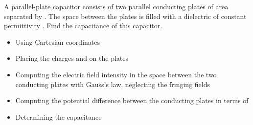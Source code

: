 \begin{ELexample}{}

A parallel-plate capacitor consists of two parallel conducting plates of area  separated by . The space between the plates is filled with a dielectric of constant permittivity \ELim{\epsilon}. Find the capacitance of this capacitor.


\begin{ELsolution}

\begin{itemize}
\tightlist
\item
  Using Cartesian coordinates
\item
  Placing the charges  and  on the plates \ELim{\ELto} 
\item
  Computing the electric field intensity in the space between the two conducting plates with Gauss's law, neglecting the fringing fields
\end{itemize}


\begin{itemize}
\tightlist
\item
  Computing the potential difference between the conducting plates in terms of 
\end{itemize}


\begin{itemize}
\tightlist
\item
  Determining the capacitance
\end{itemize}


\end{ELsolution}

\end{ELexample}


